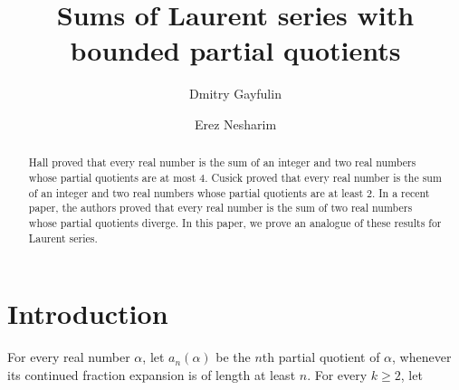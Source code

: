 \documentclass[a4paper,12pt]{article}
\begin{document}
\author{Dmitry Gayfulin}
\author{Erez Nesharim}



\title{Sums of Laurent series with bounded partial quotients}

\maketitle

\begin{abstract}
Hall \cite{hall} proved that every real number is the sum of an integer and two real numbers whose partial quotients are at most $4$. Cusick \cite{cusick} proved that every real number is the sum of an integer and two real numbers whose partial quotients are at least $2$. In a recent paper, the authors proved that every real number is the sum of two real numbers whose partial quotients diverge. 
In this paper, we prove an analogue of these results for Laurent series. %
\end{abstract}

\section{Introduction}
For every real number $\alpha$, let $a_n(\alpha)$ be the $n$th partial quotient of $\alpha$, whenever its continued fraction expansion is of length 
at least $n$. For every $k\geq2$, let
\end{document}
